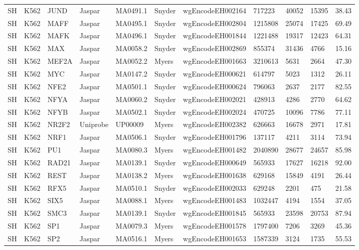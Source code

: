 {\begin{longtable}{p{0.2cm}p{1.1cm}p{1.0cm}p{1.0cm}p{1.0cm}p{1.0cm}p{2.3cm}p{1.0cm}p{0.8cm}p{0.8cm}p{0.8cm}}
SH & K562 & JUND & Jaspar & MA0491.1 & Snyder & wgEncodeEH002164 & 717223 & 40052 & 15395 & 38.43\\
SH & K562 & MAFF & Jaspar & MA0495.1 & Snyder & wgEncodeEH002804 & 1215808 & 25074 & 17425 & 69.49\\
SH & K562 & MAFK & Jaspar & MA0496.1 & Snyder & wgEncodeEH001844 & 1221488 & 19317 & 12423 & 64.31\\
SH & K562 & MAX & Jaspar & MA0058.2 & Snyder & wgEncodeEH002869 & 855374 & 31436 & 4766 & 15.16\\
SH & K562 & MEF2A & Jaspar & MA0052.2 & Myers & wgEncodeEH001663 & 3210613 & 5631 & 2664 & 47.30\\
SH & K562 & MYC & Jaspar & MA0147.2 & Snyder & wgEncodeEH000621 & 614797 & 5023 & 1312 & 26.11\\
SH & K562 & NFE2 & Jaspar & MA0501.1 & Snyder & wgEncodeEH000624 & 796063 & 2637 & 2177 & 82.55\\
SH & K562 & NFYA & Jaspar & MA0060.2 & Snyder & wgEncodeEH002021 & 428913 & 4286 & 2770 & 64.62\\
SH & K562 & NFYB & Jaspar & MA0502.1 & Snyder & wgEncodeEH002024 & 470725 & 10096 & 7786 & 77.11\\
SH & K562 & NR2F2 & Uniprobe & UP00009 & Myers & wgEncodeEH002382 & 626663 & 16678 & 2971 & 17.81\\
SH & K562 & NRF1 & Jaspar & MA0506.1 & Snyder & wgEncodeEH001796 & 137117 & 4211 & 3114 & 73.94\\
SH & K562 & PU1 & Jaspar & MA0080.3 & Myers & wgEncodeEH001482 & 2040890 & 28677 & 24657 & 85.98\\
SH & K562 & RAD21 & Jaspar & MA0139.1 & Snyder & wgEncodeEH000649 & 565933 & 17627 & 16218 & 92.00\\
SH & K562 & REST & Jaspar & MA0138.2 & Myers & wgEncodeEH001638 & 629168 & 15849 & 4191 & 26.44\\
SH & K562 & RFX5 & Jaspar & MA0510.1 & Snyder & wgEncodeEH002033 & 629248 & 2201 & 475 & 21.58\\
SH & K562 & SIX5 & Jaspar & MA0088.1 & Myers & wgEncodeEH001483 & 1032447 & 4194 & 1554 & 37.05\\
SH & K562 & SMC3 & Jaspar & MA0139.1 & Snyder & wgEncodeEH001845 & 565933 & 23598 & 20753 & 87.94\\
SH & K562 & SP1 & Jaspar & MA0079.3 & Myers & wgEncodeEH001578 & 1797400 & 7206 & 3269 & 45.36\\
SH & K562 & SP2 & Jaspar & MA0516.1 & Myers & wgEncodeEH001653 & 1587339 & 3124 & 1735 & 55.53\\

\end{longtable}}
